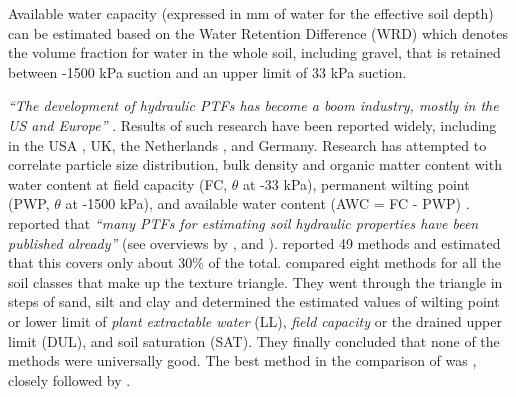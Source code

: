 \documentclass[11pt]{krantz}
\makeatletter
\newenvironment{kframe}{%
\medskip{}
\setlength{\fboxsep}{.8em}
 \def\at@end@of@kframe{}%
 \ifinner\ifhmode%
  \def\at@end@of@kframe{\end{minipage}}%
  \begin{minipage}{\columnwidth}%
 \fi\fi%
 \def\FrameCommand##1{\hskip\@totalleftmargin \hskip-\fboxsep
 \colorbox{shadecolor}{##1}\hskip-\fboxsep
     \hskip-\linewidth \hskip-\@totalleftmargin \hskip\columnwidth}%
 \MakeFramed {\advance\hsize-\width
   \@totalleftmargin\z@ \linewidth\hsize
   \@setminipage}}%
 {\par\unskip\endMakeFramed%
 \at@end@of@kframe}
\newenvironment{rmdblock}[1]
  {
  \begin{itemize}
  \renewcommand{\labelitemi}{
    \raisebox{-.7\height}[0pt][0pt]{
      {\setkeys{Gin}{width=3em,keepaspectratio}\texttt{[image: images/\#1]}}
    }
  }
  \setlength{\fboxsep}{1em}
  \begin{kframe}
  \item
  }
  {
  \end{kframe}
  \end{itemize}
  }
\newenvironment{rmdnote}
  {\begin{rmdblock}{note}}
  {\end{rmdblock}}
\theoremstyle{definition}
\theoremstyle{definition}
\theoremstyle{definition}
\theoremstyle{remark}
\makeatother
\begin{document}
\begin{rmdnote}
Available water capacity (expressed in mm of water for the effective
soil depth) can be estimated based on the Water Retention Difference
(WRD) which denotes the volume fraction for water in the whole soil,
including gravel, that is retained between -1500 kPa suction and an
upper limit of 33 kPa suction.
\end{rmdnote}

\emph{``The development of hydraulic PTFs has become a boom industry,
mostly in the US and Europe''} \citep{Minasny2007JITL}. Results of such
research have been reported widely, including in the USA
\citep{Rawls1991AA}, UK, the Netherlands \citep{Wosten1995G}, and
Germany. Research has attempted to correlate particle size distribution,
bulk density and organic matter content with water content at field
capacity (FC, \(\theta\) at -33 kPa), permanent wilting point (PWP,
\(\theta\) at -1500 kPa), and available water content (AWC = FC - PWP)
\citep{Minasny2007JITL}. \citet{Gijsman2007CEA} reported that
\emph{``many PTFs for estimating soil hydraulic properties have been
published already''} (see overviews by \citet{Rawls1991AA},
\citet{Timlin1996AS} and \citet{Wosten2001JH}). \citet{Timlin1996AS}
reported 49 methods and estimated that this covers only about 30\% of
the total. \citet{Gijsman2007CEA} compared eight methods for all the
soil classes that make up the texture triangle. They went through the
triangle in steps of sand, silt and clay and determined the estimated
values of wilting point or lower limit of \emph{plant extractable water}
(LL), \emph{field capacity} or the drained upper limit (DUL), and soil
saturation (SAT). They finally concluded that none of the methods were
universally good. The best method in the comparison of
\citet{Gijsman2007CEA} was \citet{Saxton1986SSSAJ}, closely followed by
\citet{Rawls1982JIDDASCE}.
\end{document}
